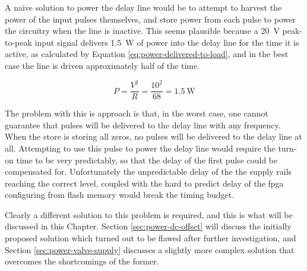 A naive solution to power the delay line would be to attempt to harvest the power of the input pulses themselves, and store power from each pulse to power the circuitry when the line is inactive. This seems plausible because a \SI{20}{\volt} peak-to-peak input signal delivers \SI{1.5}{\watt} of power into the delay line for the time it is active, as calculated by Equation \ref{eq:power-delivered-to-load}, and in the best case the line is driven approximately half of the time.

\begin{equation}
P = \frac{V^2}{R} = \frac{10^2}{68} = \SI{1.5}{\watt} \label{eq:power-delivered-to-load}
\end{equation}

The problem with this is approach is that, in the worst case, one cannot guarantee that pulses will be delivered to the delay line with any frequency. When the store is storing all zeros, no pulses will be delivered to the delay line at all. Attempting to use this pulse to power the delay line would require the turn-on time to be very predictably, so that the delay of the first pulse could be compensated for. Unfortunately the unpredictable delay of the the supply rails reaching the correct level, coupled with the hard to predict delay of the \gls{fpga} configuring from flash memory would break the timing budget.

Clearly a different solution to this problem is required, and this is what will be discussed in this Chapter. Section \ref{sec:power-dc-offset} will discuss the initially proposed solution which turned out to be flawed after further investigation, and Section \ref{sec:power-valve-supply} discusses a slightly more complex solution that overcomes the shortcomings of the former.

